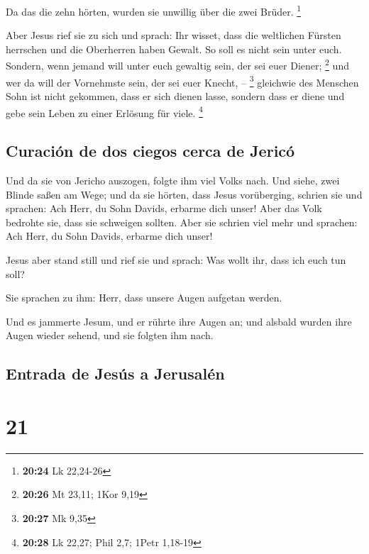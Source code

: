  Da das die zehn hörten, wurden sie unwillig über die
zwei Brüder. \footnote{\textbf{20:24} Lk 22,24-26}

 Aber Jesus rief sie zu sich und sprach: Ihr wisset, dass
die weltlichen Fürsten herrschen und die Oberherren haben Gewalt.
 So soll es nicht sein unter euch. Sondern, wenn jemand
will unter euch gewaltig sein, der sei euer Diener; \footnote{\textbf{20:26}
  Mt 23,11; 1Kor 9,19}  und wer da will der Vornehmste
sein, der sei euer Knecht, -- \footnote{\textbf{20:27} Mk 9,35}
 gleichwie des Menschen Sohn ist nicht gekommen, dass er
sich dienen lasse, sondern dass er diene und gebe sein Leben zu einer
Erlösung für viele. \footnote{\textbf{20:28} Lk 22,27; Phil 2,7; 1Petr
  1,18-19}

\hypertarget{curaciuxf3n-de-dos-ciegos-cerca-de-jericuxf3}{%
\subsection{Curación de dos ciegos cerca de
Jericó}\label{curaciuxf3n-de-dos-ciegos-cerca-de-jericuxf3}}

 Und da sie von Jericho auszogen, folgte ihm viel Volks
nach.  Und siehe, zwei Blinde saßen am Wege; und da sie
hörten, dass Jesus vorüberging, schrien sie und sprachen: Ach Herr, du
Sohn Davids, erbarme dich unser!  Aber das Volk bedrohte
sie, dass sie schweigen sollten. Aber sie schrien viel mehr und
sprachen: Ach Herr, du Sohn Davids, erbarme dich unser!

 Jesus aber stand still und rief sie und sprach: Was
wollt ihr, dass ich euch tun soll?

 Sie sprachen zu ihm: Herr, dass unsere Augen aufgetan
werden.

 Und es jammerte Jesum, und er rührte ihre Augen an; und
alsbald wurden ihre Augen wieder sehend, und sie folgten ihm nach.

\hypertarget{entrada-de-jesuxfas-a-jerusaluxe9n}{%
\subsection{Entrada de Jesús a
Jerusalén}\label{entrada-de-jesuxfas-a-jerusaluxe9n}}

\hypertarget{section-20}{%
\section{21}\label{section-20}}

